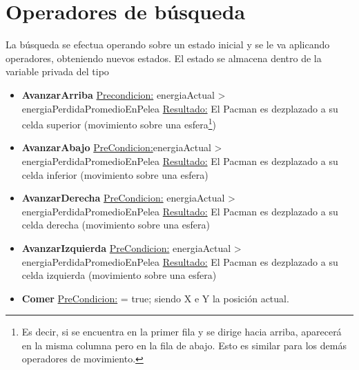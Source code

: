 ﻿\section{Operadores de búsqueda}

La búsqueda se efectua operando sobre un estado inicial y se le va aplicando
operadores, obteniendo nuevos estados. El estado se almacena dentro de
la variable privada  del tipo 

\begin{itemize}

\item \textbf{AvanzarArriba}\newline
\underline{Precondicion:} energiaActual > energiaPerdidaPromedioEnPelea\newline
\underline{Resultado:} El Pacman es dezplazado a su celda superior (movimiento
sobre una esfera\footnote{Es decir, si se encuentra en la primer fila y se
dirige hacia arriba, aparecerá en la misma columna pero en la fila de abajo.
Esto es similar para los demás operadores de movimiento.})

\item \textbf{AvanzarAbajo}\newline
\underline{PreCondicion:}energiaActual > energiaPerdidaPromedioEnPelea
\underline{Resultado:} El Pacman es dezplazado a su celda inferior (movimiento
sobre una esfera)\newline

\item \textbf{AvanzarDerecha}\newline
\underline{PreCondicion:} energiaActual > energiaPerdidaPromedioEnPelea\newline
\underline{Resultado:} El Pacman es dezplazado a su celda derecha (movimiento
sobre una esfera)\newline

\item \textbf{AvanzarIzquierda}\newline
\underline{PreCondicion:} energiaActual > energiaPerdidaPromedioEnPelea\newline
\underline{Resultado:} El Pacman es dezplazado a su celda izquierda (movimiento
sobre una esfera)\newline

\item \textbf{Comer}\newline
\underline{PreCondicion:}  = true;
siendo X e Y la posición actual.


\end{itemize}
